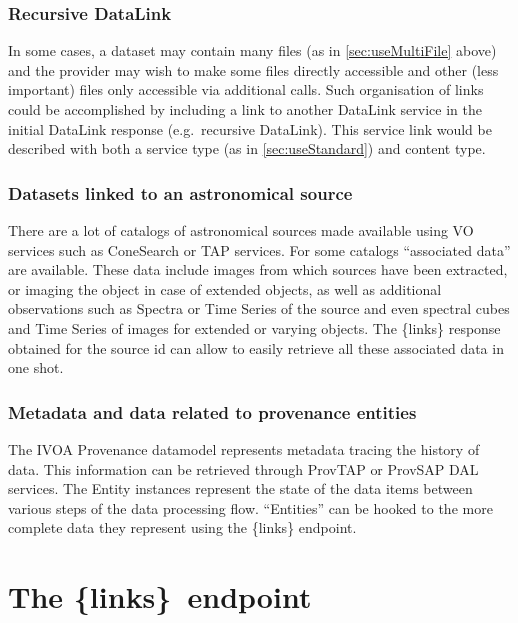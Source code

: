 \documentclass[11pt,a4paper]{ivoa}
\newcommand{\blinks}{\{links\}}
\begin{document}
\subsubsection{Recursive DataLink}

In some cases, a dataset may contain many files
(as in \ref{sec:useMultiFile} above)
and the provider may wish to make some files directly accessible and
other (less important) files only accessible via additional calls. Such
organisation of links could be accomplished by including a link to
another DataLink service in the initial DataLink response (e.g.\ recursive
DataLink). This service link would be described with both a service type
(as in \ref{sec:useStandard}) and content type.


\subsubsection{Datasets linked to an astronomical source}

There are  a lot of catalogs of astronomical sources made available
using VO services such as ConeSearch \citep{2008ivoa.specQ0222P} or TAP
services. For some catalogs ``associated data'' are available. These
data include images from which sources have been extracted, or imaging the
object in  case of extended objects, as well as additional observations
such as Spectra or Time Series of the source and even spectral cubes
and Time Series of images for extended or varying objects. The {\blinks}
response obtained for the source id can allow to easily retrieve all
these associated data in one shot.

\subsubsection{Metadata and data related to provenance entities}

The IVOA Provenance datamodel \citep{pr:provdm} represents metadata
tracing  the history of data. This information can be retrieved through
ProvTAP \citep{iwd:provtap} or ProvSAP \citep{iwd:provsap}  DAL services.
The Entity instances represent  the state of the data items between
various steps of the data processing flow. ``Entities'' can be hooked
to the more complete data they represent using the {\blinks} endpoint.

\section{The \blinks~endpoint}
\end{document}
